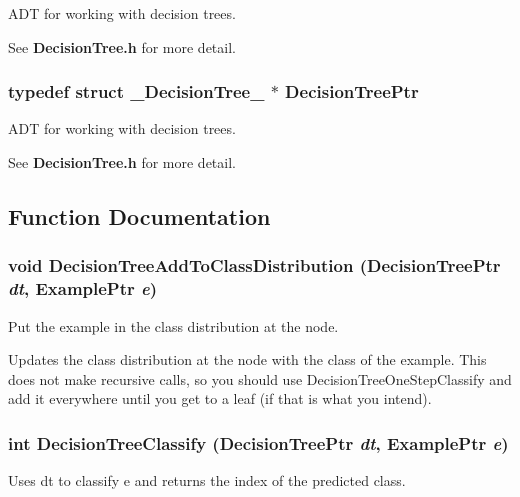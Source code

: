 ADT for working with decision trees. 

See {\bf Decision\-Tree.h} for more detail. 
\subsubsection{\setlength{\rightskip}{0pt plus 5cm}typedef struct {\bf \_\-Decision\-Tree\_\-} $\ast$ {\bf Decision\-Tree\-Ptr}}\label{DecisionTree_8h_a1}


ADT for working with decision trees. 

See {\bf Decision\-Tree.h} for more detail. 

\subsection{Function Documentation}
\subsubsection{\setlength{\rightskip}{0pt plus 5cm}void Decision\-Tree\-Add\-To\-Class\-Distribution ({\bf Decision\-Tree\-Ptr} {\em dt}, {\bf Example\-Ptr} {\em e})}\label{DecisionTree_8h_a14}


Put the example in the class distribution at the node. 

Updates the class distribution at the node with the class of the example. This does not make recursive calls, so you should use Decision\-Tree\-One\-Step\-Classify and add it everywhere until you get to a leaf (if that is what you intend). 
\subsubsection{\setlength{\rightskip}{0pt plus 5cm}int Decision\-Tree\-Classify ({\bf Decision\-Tree\-Ptr} {\em dt}, {\bf Example\-Ptr} {\em e})}\label{DecisionTree_8h_a26}


Uses dt to classify e and returns the index of the predicted class. 

